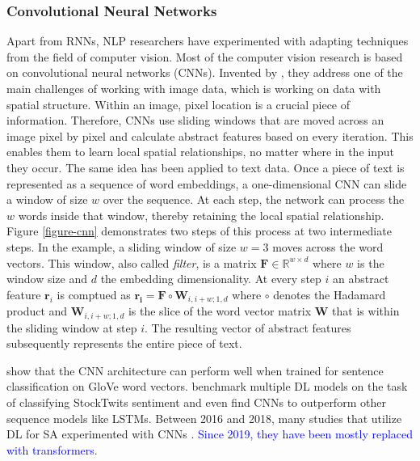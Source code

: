 \subsubsection{Convolutional Neural Networks}
Apart from RNNs, NLP researchers have experimented with adapting techniques from the field of computer vision. Most of the computer vision research is based on convolutional neural networks (CNNs). Invented by , they address one of the main challenges of working with image data, which is working on data with spatial structure. Within an image, pixel location is a crucial piece of information. Therefore, CNNs use sliding windows that are moved across an image pixel by pixel and calculate abstract features based on every iteration. This enables them to learn local spatial relationships, no matter where in the input they occur. The same idea has been applied to text data. Once a piece of text is represented as a sequence of word embeddings, a one-dimensional CNN can slide a window of size $w$ over the sequence. At each step, the network can process the $w$ words inside that window, thereby retaining the local spatial relationship. Figure \ref{figure-cnn} demonstrates two steps of this process at two intermediate steps. In the example, a sliding window of size $w = 3$ moves across the word vectors. This window, also called \emph{filter}, is a matrix $\bm{F}\in \mathbb{R}^{w \times d}$ where $w$ is the window size and $d$ the embedding dimensionality. At every step $i$ an abstract feature $\bm{r}_i$ is comptued as $\bm{r_i} = \bm{F} \circ \bm{W}_{i,i+w;1,d}$ where $\circ$ denotes the Hadamard product and $\bm{W}_{i,i+w;1,d}$ is the slice of the word vector matrix $\bm{W}$ that is  within the sliding window at step $i$. The resulting vector of abstract features subsequently represents the entire piece of text.



 show that the CNN architecture can perform well when trained for sentence classification on GloVe word vectors.  benchmark multiple DL models on the task of classifying StockTwits sentiment and even find CNNs to outperform other sequence models like LSTMs. Between 2016 and 2018, many studies that utilize DL for SA experimented with CNNs . \textcolor{blue}{Since 2019, they have been mostly replaced with transformers}.

